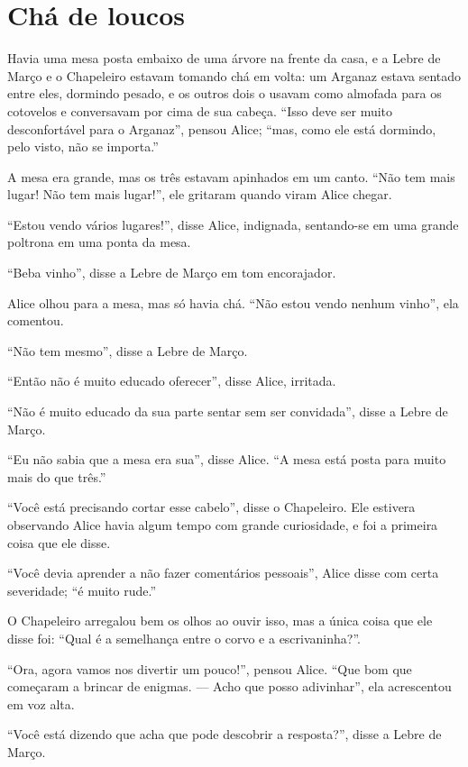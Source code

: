 \quebra\chapter{Chá de loucos}

Havia uma mesa posta embaixo de uma árvore na frente da casa, e a Lebre
de Março e o Chapeleiro estavam tomando chá em volta: um Arganaz estava
sentado entre eles, dormindo pesado, e os outros dois o usavam como
almofada para os cotovelos e conversavam por cima de sua cabeça. ``Isso
deve ser muito desconfortável para o Arganaz'', pensou Alice; ``mas,
como ele está dormindo, pelo visto, não se importa.''

A mesa era grande, mas os três estavam apinhados em um canto. ``Não tem
mais lugar! Não tem mais lugar!'', ele gritaram quando viram Alice
chegar.

``Estou vendo vários lugares!'', disse Alice, indignada, sentando-se
em uma grande poltrona em uma ponta da mesa.

``Beba vinho'', disse a Lebre de Março em tom encorajador.

Alice olhou para a mesa, mas só havia chá. ``Não estou vendo nenhum
vinho'', ela comentou.

``Não tem mesmo'', disse a Lebre de Março.

``Então não é muito educado oferecer'', disse Alice, irritada.

``Não é muito educado da sua parte sentar sem ser convidada'', disse a
Lebre de Março.

``Eu não sabia que a mesa era sua'', disse Alice. ``A mesa está posta
para muito mais do que três.''

``Você está precisando cortar esse cabelo'', disse o Chapeleiro. Ele
estivera observando Alice havia algum tempo com grande curiosidade, e
foi a primeira coisa que ele disse.

``Você devia aprender a não fazer comentários pessoais'', Alice disse
com certa severidade; ``é muito rude.''

O Chapeleiro arregalou bem os olhos ao ouvir isso, mas a única coisa que
ele disse foi: ``Qual é a semelhança entre o corvo e a escrivaninha?''.

``Ora, agora vamos nos divertir um pouco!'', pensou Alice. ``Que bom
que começaram a brincar de enigmas. --- Acho que posso adivinhar'', ela
acrescentou em voz alta.

``Você está dizendo que acha que pode descobrir a resposta?'', disse a
Lebre de Março.

